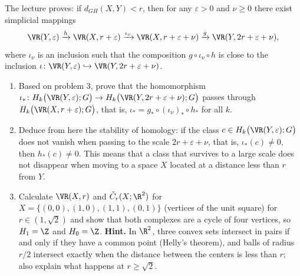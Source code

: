 \documentclass[a4paper,12pt]{report}
\begin{document}
\begin{task}
The lecture proves\textup{:} if $d_{GH}(X, Y) < r$, then for any $\varepsilon > 0$ and $\nu \ge 0$ there exist simplicial mappings
\[
\VR(Y, \varepsilon) \xrightarrow{h} \VR(X, r+\varepsilon) \xrightarrow{\iota_\nu} \VR(X, r+\varepsilon+\nu) \xrightarrow{g} \VR(Y, 2r+\varepsilon+\nu),
\]
where $\iota_\nu$ is an inclusion such that the composition $g \circ \iota_\nu \circ h$ is close to the inclusion $\iota \colon \VR(Y, \varepsilon) \hookrightarrow \VR(Y, 2r+\varepsilon+\nu)$.
\begin{enumerate}[label=\textup{(\alph*)}]
\item Based on problem \textup{3}, prove that the homomorphism $\iota_* \colon H_k\bigl(\VR(Y, \varepsilon); G\bigr) \to H_k\bigl(\VR(Y, 2r+\varepsilon+\nu); G\bigr)$ passes through $H_k\bigl(\VR(X, r+\varepsilon); G\bigr)$, that is, $\iota_* = g_* \circ (\iota_\nu)_* \circ h_*$ for all $k$.
\item Deduce from here the stability of homology\textup{:} if the class $c \in H_k\bigl(\VR(Y, \varepsilon); G\bigr)$ does not vanish when passing to the scale $2r+\varepsilon+\nu$, that is, $\iota_*(c) \neq 0$, then $h_*(c) \neq 0$. This means that a class that survives to a large scale does not disappear when moving to a space $X$ located at a distance less than $r$ from $Y$.
\item Calculate $\VR(X, r)$ and $\check C_r(X; \R^2)$ for $X = \{(0,0), (1,0), (1,1), (0,1)\}$ \textup{(}vertices of the unit square\textup{)} for $r \in (1, \sqrt{2})$ and show that both complexes are a cycle of four vertices, so $H_1 = \Z$ and $H_0 = \Z$. \textbf{Hint.} In $\R^2$, three convex sets intersect in pairs if and only if they have a common point \textup{(}Helly's theorem\textup{)}, and balls of radius $r/2$ intersect exactly when the distance between the centers is less than $r$\textup{;} also explain what happens at $r \ge \sqrt{2}$.
\end{enumerate}
\end{task}
\end{document}
